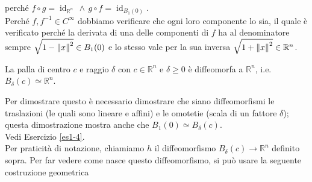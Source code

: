 perché $ f \circ g = \operatorname{id}_{\mathbb{R}^{n}} \, \wedge \, g \circ f = \operatorname{id}_{B_{1} (0)} $.\\
Perché $ f, f^{-1} \in C^{\infty} $ dobbiamo verificare che ogni loro componente lo sia, il quale è verificato perché la derivata di una delle componenti di $ f $ ha al denominatore sempre $ \sqrt{1 - \norm{x}^{2}} \in B_{1} (0) $ e lo stesso vale per la sua inversa $ \sqrt{1 + \norm{x}^{2}} \in \mathbb{R}^{n} $.

\begin{corollary}
	La palla di centro $ c $ e raggio $ \delta $ con $ c \in \mathbb{R}^{n} $ e $ \delta \geqslant 0 $ è diffeomorfa a $ \mathbb{R}^{n} $, i.e. $ B_{\delta} (c) \simeq \mathbb{R}^{n} $.
\end{corollary}

Per dimostrare questo è necessario dimostrare che siano diffeomorfismi le traslazioni (le quali sono lineare e affini) e le omotetie (scala di un fattore $ \delta $); questa dimostrazione mostra anche che $ B_{1} (0) \simeq B_{\delta} (c) $.\\
Vedi Esercizio \ref{es1-4}.\\
Per praticità di notazione, chiamiamo $ h $ il diffeomorfismo $ B_{\delta} (c) \to \mathbb{R}^{n} $ definito sopra. Per far vedere come nasce questo diffeomorfismo, si può usare la seguente costruzione geometrica

